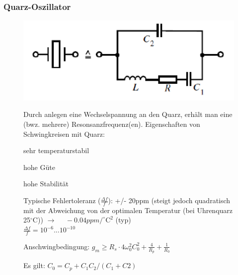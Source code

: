 \subsubsection{Quarz-Oszillator }
\vspace{-1.05cm}
\begin{figure}[h!]
	\begin{minipage}{0.3\textwidth} 
	\includegraphics[width=1\textwidth]{images/Ersatzschaltbild_Schwingquarz}
	\end{minipage}
	\begin{minipage}{0.6\textwidth}
	   Durch anlegen eine Wechselspannung an den Quarz, erhält man eine (bwz. mehrere) Resonsanzfrequenz(en).
       Eigenschaften von Schwingkreisen mit Quarz:
      \begin{compactitem}
        \item sehr temperaturstabil
        \item hohe Güte
        \item hohe Stabilität
        \item Typische Fehlertoleranz ($\frac{\Delta f}{f}$): +/- 20ppm (steigt jedoch quadratisch mit der Abweichung von der optimalen Temperatur (bei Uhrenquarz 25$^\circ$C)) $\rightarrow$ $\quad-0.04ppm/^\circ \text{C}^2$ (typ)\\
        $\frac{\Delta f}{f}=10^{-6}...10^{-10}$
        \item Anschwingbedingung: $g_m \geq R_s\cdot4\omega_0^2C_0 ^2+\frac{4}{R_p}+\frac{1}{R_0}$
        \begin{compactitem}
          \item Es gilt: $ C_0 = C_p+C_1C_2/(C_1+C2)$
        \end{compactitem} 
      \end{compactitem} 
	\end{minipage}
	\begin{minipage}{0.3\textwidth} 

\end{minipage}
\end{figure}
